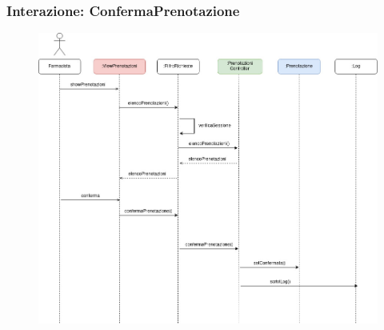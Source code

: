 \newpage

\subsubsection*{Interazione: ConfermaPrenotazione}
\begin{figure}[h!]
    \begin{center}
        \includegraphics[width=\textwidth]{immagini/Interazione-ConfermaPrenotazione-progettaz.jpg}
    \end{center}
\end{figure}

\newpage

